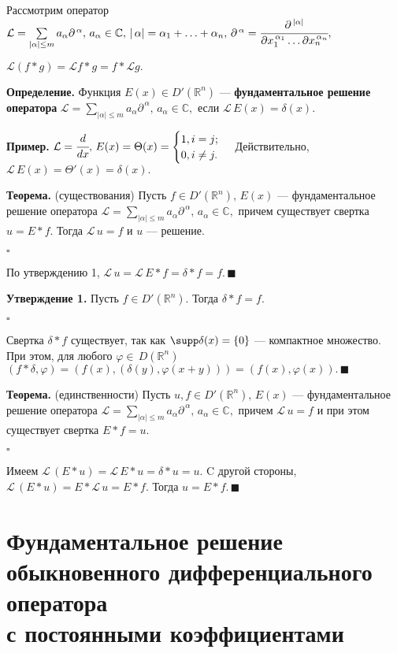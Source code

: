 \documentclass[unicode,12pt,draft]{article}
\begin{document}
Рассмотрим оператор $\mathcal L=\sum\limits_{|\alpha|\le
m}a_{\alpha}{\partial^{\, \alpha}},\, a_{\alpha}\in \mathbb C,\,
|\,\alpha|=\alpha_1+\ldots+\alpha_n, \,\partial^{\,\alpha}=\cfrac
{\partial^{\,|\alpha|}}{\partial x_1^{\,\alpha_1}\ldots
\partial x_n^{\,\alpha_n}},$

$\mathcal L(f*g)=\mathcal L f*g=f*\mathcal L g.$

\textbf{Определение.} Функция $E(x)\in D'(\mathbb R^n)$
--- \textbf{фундаментальное решение оператора}
$\mathcal L=\sum\limits_{|\alpha|\le m}a_{\alpha}{\partial^{\,
\alpha}},\, a_{\alpha}\in \mathbb C,$ если $\mathcal
L\,E(x)=\delta(x).$

\textbf{Пример.} $\mathcal L=\cfrac d{dx},\,
E(x)=\Theta(x)=\begin{cases} 1, i=j;\\ 0, i \ne j.\end{cases}$
Действительно, $\mathcal L\,E(x)=\Theta'(x)=\delta(x).$

\textbf{Теорема.} (существования) Пусть $f\in D'(\mathbb R^n),\,
E(x)$ --- фундаментальное решение оператора $\mathcal
L=\sum\limits_{|\alpha|\le m}a_{\alpha}{\partial^{\, \alpha}},\,
a_{\alpha}\in \mathbb C,$ причем существует свертка $u=E*f.$ Тогда
$\mathcal L\,u=f$ и $u$ --- решение.

$\square$

По утверждению 1, $\mathcal L\,u=\mathcal
L\,E*f=\delta*f=f.\,\blacksquare$

\textbf{Утверждение 1.} Пусть $f\in D'(\mathbb R^n).$ Тогда
$\delta*f=f.$

$\square$

Свертка $\delta*f$ существует, так как $\supp \delta(x)=\{0\}$ ---
компактное множество. При этом, для любого $\varphi\in\,D(\mathbb
R^n)$
$(f*\delta,\varphi)=(f(x),(\delta(y),\varphi(x+y)))=(f(x),\varphi(x)).\,\blacksquare$

\textbf{Теорема.} (единственности) Пусть $u,f\in D'(\mathbb
R^n),\, E(x)$ --- фундаментальное решение оператора $\mathcal
L=\sum\limits_{|\alpha|\le m}a_{\alpha}{\partial^{\, \alpha}},\,
a_{\alpha}\in \mathbb C,$ причем $\mathcal L\,u=f$ и при этом
существует свертка $E*f=u.$

$\square$

Имеем $\mathcal L\,(E*u)=\mathcal L\,E*u=\delta*u=u.$ C другой
стороны, $\mathcal L\,(E*u)=E*\mathcal L\,u=E*f$. Тогда
$u=E*f.\,\blacksquare$

\section{Фундаментальное решение обыкновенного дифференциального оператора\\
с постоянными коэффициентами}
\end{document}
